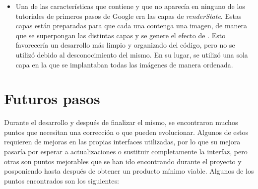 \documentclass{subfiles}
\begin{document}
\begin{itemize}
        \item Una de las características que contiene \webxr y que no aparecía en ninguno de los tutoriales de primeros pasos de Google era las capas de \textit{renderState}. Estas capas están preparadas para que cada una contenga una imagen, de manera que se superpongan las distintas capas y se genere el efecto de \ra. Esto favorecería un desarrollo más limpio y organizado del código, pero no se utilizó debido al desconocimiento del mismo. En su lugar, se utilizó una sola capa en la que se implantaban todas las imágenes de manera ordenada.
    \end{itemize}

    \section{Futuros pasos}
    \label{sec:futuros_pasos}
    Durante el desarrollo y después de finalizar el mismo, se encontraron muchos puntos que necesitan una corrección o que pueden evolucionar. Algunos de estos requieren de mejoras en las propias interfaces utilizadas, por lo que su mejora pasaría por esperar a actualizaciones o sustituir completamente la interfaz, pero otras son puntos mejorables que se han ido encontrando durante el proyecto y posponiendo hasta después de obtener un producto mínimo viable. Algunos de los puntos encontrados son los siguientes:
\end{document}
